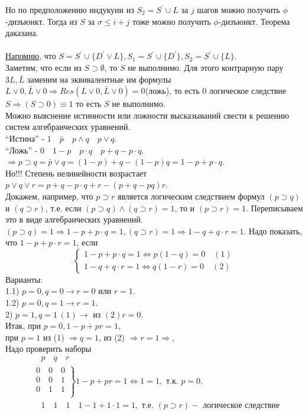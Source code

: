 \documentclass{article}
\numberwithin{example}{section}
\numberwithin{question}{section}
\numberwithin{Remark}{section}
\numberwithin{theorem}{section}
\numberwithin{definition}{section}
\numberwithin{proposition}{section}
\begin{document}
Но по предположению индукуии из $S_2 =S^{'}\cup L$ за $j$ шагов можно получить $\phi$-дизъюнкт. Тогда из $S$ за $\sigma \le i+j$ тоже можно получить $\phi$-дизъюнкт. Теорема даказана.\\
\\
\underline{Напомню}, что $S=S^{'}\cup \{D^{'}\lor L\},S_1 = S^{'}\cup \{D^{'}\},S_2 =S^{'}\cup \{L\}$.\\
Заметим, что если из $S \supset \emptyset$, то $S$ не выполнимо. Для этого контрарную пару $3L, \bar{L}$ заменим на эквивалентные им формулы $L\lor 0, \bar{L}\lor 0\Rightarrow Res(L\lor 0,\bar{L}\lor 0)=0$(ложь), то есть 0 логическое следствие $S\Rightarrow (S\supset 0)\equiv 1$ то есть $S$ не выполнимо.\\
Можно выяснение истинности или ложности высказываний свести к решению систем алгебраических уравнений.\\
``Истина'' - $1\quad\bar{p}\quad p\wedge q\quad p\vee q$.\\
``Ложь'' - $0\quad 1-p\quad p\cdot q\quad p+q-p\cdot q$.\\
$\Rightarrow p\supset q = \bar{p}\vee q=(1-p)+q-(1-p)q=1-p+p\cdot q$.\\
Но!!! Степень нелинейности возрастает $p\vee q\vee r=p+q-p\cdot q+r-(p+q-pq)r$.\\
Докажем, например, что $p\supset r$ является логическим следствием формул $(p\supset q)$ и $(q\supset r)$, т.е. если $(p\supset q)\wedge(q\supset r)=1$, то и $(p\supset r)=1$. Переписываем это в виде алгебраических уравнений. \\
$(p\supset q)=1\Rightarrow 1-p+p\cdot q=1,(q\supset r)=1\Rightarrow 1-q+q\cdot r=1$. Надо показать, что $1-p+p\cdot r=1$, если
\begin{equation*}
\left\{\begin{array}{l}
1-p+p\cdot q=1\Leftrightarrow p(1-q)=0\quad (1)\\
1-q+q\cdot r=1\Leftrightarrow q(1-r)=0\quad (2)
\end{array}\right.
\end{equation*}
Варианты:\\
1.1) $p=0,q=0\to r=0\text{ или } r=1$.\\
1.2) $p=0,q=1\to r=1$.\\
2) $p=1,q=1 \,(1)\to \text{ из }(2) r=0$.\\
Итак, при $p=0,1-p+pr=1$,\\
при $p=1$ из (1) $\Rightarrow q=1$, из (2) $\Rightarrow r=1\Rightarrow$,\\
Надо проверить наборы
\begin{equation*}
\begin{aligned}
&\quad p\quad q\quad r\\
&\left.\begin{array}{l}
0\quad 0\quad 0\\
0\quad 0\quad 1\\
0\quad 1\quad 1\\
\end{array}\right\} 1-p+pr=1\Leftrightarrow 1=1, \text{ т.к. } p=0.\\
&\quad 1\quad 1 \quad 1 \quad 1-1+1\cdot 1=1,\text{ т.е. } (p\supset r) - \text{ логическое следствие } 
\end{aligned}
\end{equation*}
\end{document}
